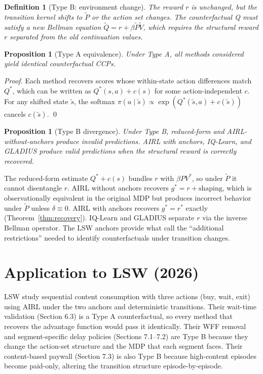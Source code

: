 \documentclass[11pt]{article}
\newtheorem{proposition}[theorem]{Proposition}
\newtheorem{definition}[theorem]{Definition}
\begin{document}
\begin{definition}[Type B: environment change]
The reward $r$ is unchanged, but the transition kernel shifts to $\tilde{P}$ or the action set changes. The counterfactual Q must satisfy a new Bellman equation $\tilde{Q} = r + \beta \tilde{P}\tilde{V}$, which requires the structural reward $r$ separated from the old continuation values.
\end{definition}

\begin{proposition}[Type A equivalence]\label{prop:type1}
Under Type A, all methods considered yield identical counterfactual CCPs.
\end{proposition}
\begin{proof}
Each method recovers scores whose within-state action differences match $Q^*$, which can be written as $Q^*(s,a) + c(s)$ for some action-independent $c$. For any shifted state $\tilde{s}$, the softmax $\pi(a \mid \tilde{s}) \propto \exp(Q^*(\tilde{s},a) + c(\tilde{s}))$ cancels $c(\tilde{s})$. \qed
\end{proof}

\begin{proposition}[Type B divergence]\label{prop:type2}
Under Type B, reduced-form and AIRL-without-anchors produce invalid predictions. AIRL with anchors, IQ-Learn, and GLADIUS produce valid predictions when the structural reward is correctly recovered.
\end{proposition}

The reduced-form estimate $Q^* + c(s)$ bundles $r$ with $\beta PV^*$, so under $\tilde{P}$ it cannot disentangle $r$. AIRL without anchors recovers $g^* = r + \text{shaping}$, which is observationally equivalent in the original MDP but produces incorrect behavior under $\tilde{P}$ unless $\delta \equiv 0$. AIRL with anchors recovers $g^* = r^*$ exactly (Theorem~\ref{thm:recovery}). IQ-Learn and GLADIUS separate $r$ via the inverse Bellman operator. The LSW anchors provide what \citet{kalouptsidi2021} call the ``additional restrictions'' needed to identify counterfactuals under transition changes.

\section{Application to LSW (2026)}

LSW study sequential content consumption with three actions (buy, wait, exit) using AIRL under the two anchors and deterministic transitions. Their wait-time validation (Section 6.3) is a Type A counterfactual, so every method that recovers the advantage function would pass it identically. Their WFF removal and segment-specific delay policies (Sections 7.1--7.2) are Type B because they change the action-set structure and the MDP that each segment faces. Their content-based paywall (Section 7.3) is also Type B because high-content episodes become paid-only, altering the transition structure episode-by-episode.
\end{document}
